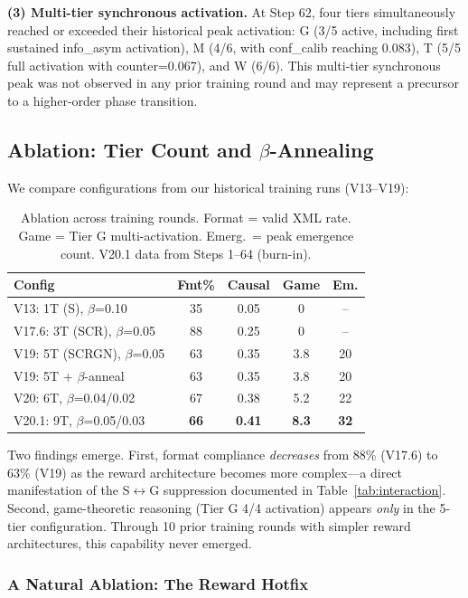\documentclass[sigconf]{acmart}
\begin{document}
\textbf{(3) Multi-tier synchronous activation.} At Step 62, four tiers simultaneously reached or exceeded their historical peak activation: G (3/5 active, including first sustained info\_asym activation), M (4/6, with conf\_calib reaching 0.083), T (5/5 full activation with counter=0.067), and W (6/6). This multi-tier synchronous peak was not observed in any prior training round and may represent a precursor to a higher-order phase transition.

\subsection{Ablation: Tier Count and $\beta$-Annealing}

We compare configurations from our historical training runs (V13--V19):

\begin{table}[t]
\centering
\scriptsize
\caption{Ablation across training rounds. Format = valid XML rate. Game = Tier G multi-activation. Emerg.~= peak emergence count. V20.1 data from Steps 1--64 (burn-in).}
\label{tab:ablation}
\begin{tabular}{@{}l cccc @{}}
\toprule
\textbf{Config} & \textbf{Fmt\%} & \textbf{Causal} & \textbf{Game} & \textbf{Em.} \\
\midrule
V13: 1T (S), $\beta$=0.10 & 35 & 0.05 & 0 & -- \\
V17.6: 3T (SCR), $\beta$=0.05 & 88 & 0.25 & 0 & -- \\
V19: 5T (SCRGN), $\beta$=0.05 & 63 & 0.35 & 3.8 & 20 \\
V19: 5T + $\beta$-anneal & 63 & 0.35 & 3.8 & 20 \\
V20: 6T, $\beta$=0.04/0.02 & 67 & 0.38 & 5.2 & 22 \\
V20.1: 9T, $\beta$=0.05/0.03 & \textbf{66} & \textbf{0.41} & \textbf{8.3} & \textbf{32} \\
\bottomrule
\end{tabular}
\end{table}

Two findings emerge. First, format compliance \textit{decreases} from 88\% (V17.6) to 63\% (V19) as the reward architecture becomes more complex---a direct manifestation of the S$\leftrightarrow$G suppression documented in Table~\ref{tab:interaction}. Second, game-theoretic reasoning (Tier G 4/4 activation) appears \textit{only} in the 5-tier configuration. Through 10 prior training rounds with simpler reward architectures, this capability never emerged.

\subsubsection{A Natural Ablation: The Reward Hotfix}
\end{document}
